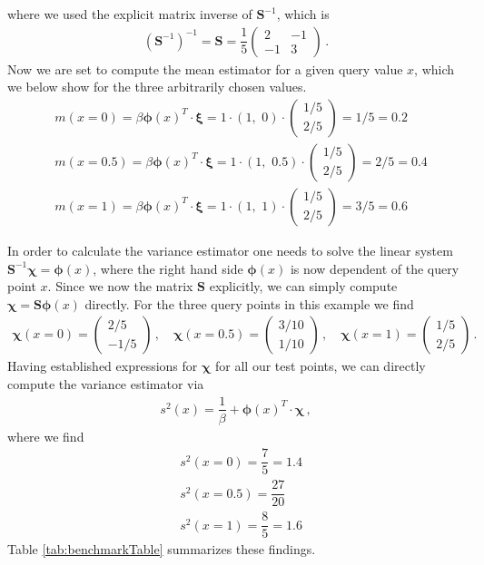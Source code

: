 \documentclass[11pt, DINA4, fleqn]{amsart}
\begin{document}
where we used the explicit matrix inverse of $\bm{S}^{-1}$, which is
\begin{align}
(\bm{S}^{-1})^{-1} = \bm{S} = \dfrac{1}{5}\begin{pmatrix}
2 & -1 \\ -1 & 3
\end{pmatrix}\, .
\end{align}
Now we are set to compute the mean estimator for a given query value $x$, which we below show for the three arbitrarily chosen values.
\begin{align}
&m(x = 0) = \beta\bm{\phi}(x)^T \cdot \bm{\xi} = 1 \cdot (1 ,\, \, 0) \cdot \begin{pmatrix}
1/5 \\ 2/5
\end{pmatrix} = 1/5 = 0.2 \\
&m(x = 0.5) = \beta\bm{\phi}(x)^T \cdot \bm{\xi} = 1 \cdot (1 ,\, \, 0.5) \cdot \begin{pmatrix}
1/5 \\ 2/5
\end{pmatrix} = 2/5 = 0.4\\
&m(x = 1) = \beta\bm{\phi}(x)^T \cdot \bm{\xi} = 1 \cdot (1 ,\, \, 1) \cdot \begin{pmatrix}
1/5 \\ 2/5
\end{pmatrix} = 3/5 = 0.6
\end{align}

In order to calculate the variance estimator one needs to solve the linear system $\bm{S}^{-1} \bm{\chi} = \bm{\phi}(x)$, where the right hand side $\bm{\phi}(x)$ is now dependent of the query point $x$. Since we now the matrix $\bm{S}$ explicitly, we can simply compute $\bm{\chi} = \bm{S}\bm{\phi}(x)$ directly. For the three query points in this example we find
\begin{align}
\bm{\chi}(x = 0) = \begin{pmatrix}2/5 \\ -1/5\end{pmatrix} \, ,
\quad
\bm{\chi}(x = 0.5) = \begin{pmatrix}3/10 \\ 1/10\end{pmatrix} \, ,
\quad
\bm{\chi}(x = 1) = \begin{pmatrix}1/5 \\ 2/5\end{pmatrix} \, .
\end{align}
Having established expressions for $\bm{\chi}$ for all our test points, we can directly compute the variance estimator via
\begin{align}
s^2(x) = \dfrac{1}{\beta} + \bm{\phi}(x)^T \cdot \bm{\chi} \, ,
\end{align}
where we find
\begin{align}
&s^2(x = 0) = \dfrac{7}{5} = 1.4 \\ 
&s^2(x = 0.5) = \dfrac{27}{20} \\
&s^2(x = 1) = \dfrac{8}{5} = 1.6
\end{align}
Table \ref{tab:benchmarkTable} summarizes these findings.
\end{document}
